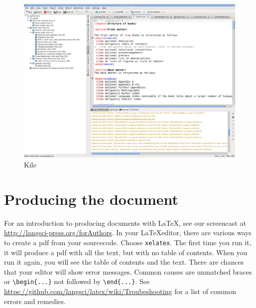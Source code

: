 \begin{figure}
\includegraphics[width=\textwidth]{kile.png}
\caption{Kile}
\label{fig:latex:kile} 
\end{figure}

  
% 
\section{Producing the document}
For an introduction to producing documents with \LaTeX, see our screencast at \url{http://langsci-press.org/forAuthors}.
In your \LaTeX editor, there are various ways to create a pdf from your sourcecode. Choose \verb+xelatex+. The first time you run it, it will produce a pdf with all the text, but with no table of contents. When you run it again, you will see the table of contents and the text. There are chances that your editor will show error messages. Common causes are unmatched braces or \verb+\begin{...}+ not followed by \verb+\end{...}+. See \url{https://github.com/langsci/latex/wiki/Troubeshooting} for a list of common errors and remedies.




